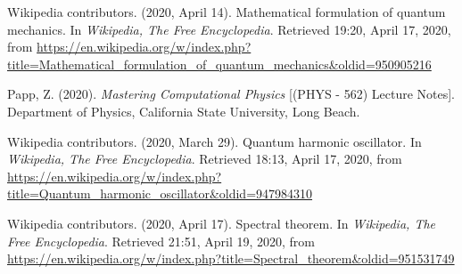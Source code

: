 \documentclass[12pt]{article}
\begin{document}
\begin{thebibliography}{}

 Wikipedia contributors. (2020, April 14). Mathematical formulation of quantum mechanics. In {\it Wikipedia, The Free Encyclopedia}. Retrieved 19:20, April 17, 2020, from \url{https://en.wikipedia.org/w/index.php?title=Mathematical_formulation_of_quantum_mechanics&oldid=950905216}

 Papp, Z. (2020). {\it Mastering Computational Physics} [(PHYS - 562) Lecture Notes]. Department of Physics, California State University, Long Beach.

 Wikipedia contributors. (2020, March 29). Quantum harmonic oscillator. In {\it Wikipedia, The Free Encyclopedia}. Retrieved 18:13, April 17, 2020, from 
\url{https://en.wikipedia.org/w/index.php?title=Quantum_harmonic_oscillator&oldid=947984310}

 Wikipedia contributors. (2020, April 17). Spectral theorem. In {\it Wikipedia, The Free Encyclopedia}. Retrieved 21:51, April 19, 2020, from \url{https://en.wikipedia.org/w/index.php?title=Spectral_theorem&oldid=951531749}
 
\end{thebibliography}
\end{document}
